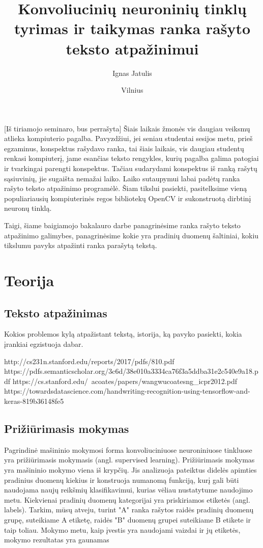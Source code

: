 \documentclass{VUMIFInfBakalaurinis}
\title{Konvoliucinių neuroninių tinklų tyrimas ir taikymas ranka rašyto teksto atpažinimui}
\author{Ignas Jatulis}
\date{Vilnius \\ \the\year}
\begin{document}
\maketitle

\tableofcontents


[Iš tiriamojo seminaro, bus perrašyta]
Šiais laikais žmonės vis daugiau veiksmų atlieka kompiuterio pagalba. Pavyzdžiui, jei seniau studentai sesijos metu, prieš egzaminus, konspektus rašydavo ranka, tai šiais laikais, vis daugiau studentų renkasi kompiuterį, jame esančias teksto rengykles, kurių pagalba galima patogiai ir tvarkingai parengti konspektus. Tačiau sudarydami konspektus iš ranką rašytų sąsiuvinių, jie sugaišta nemažai laiko.  Laiko sutaupymui labai padėtų ranka rašyto teksto atpažinimo programėlė. Šiam tikslui pasiekti, pasitelksime vieną populiariausių kompiuterinės regos bibliotekų OpenCV ir sukonstruotą dirbtinį neuronų tinklą.

Taigi, šiame baigiamojo bakalauro darbe panagrinėsime ranka rašyto teksto atpažinimo galimybes, panagrinėsime kokie yra pradinių duomenų šaltiniai, kokiu tikslumu pavyks atpažinti ranka parašytą tekstą.

\section{Teorija}

\subsection{Teksto atpažinimas}
Kokios problemos kylą atpažistant tekstą, istorija, ką pavyko pasiekti, kokia įrankiai egzistuoja dabar.

http://cs231n.stanford.edu/reports/2017/pdfs/810.pdf
https://pdfs.semanticscholar.org/3c6d/38e010a3334ca76f3a5ddba31e2c540e9a18.pdf
https://cs.stanford.edu/~acoates/papers/wangwucoatesng_icpr2012.pdf
https://towardsdatascience.com/handwriting-recognition-using-tensorflow-and-keras-819b36148fe5


\subsection{Prižiūrimasis mokymas}

Pagrindinė mašininio mokymosi forma konvoliuciniuose neuroniniuose tinkluose yra prižiūrimasis mokymasis (angl. supervised learning). Prižiūrimasis mokymas yra mašininio mokymo viena iš krypčių. Jis analizuoja pateiktus didelės apimties pradinius duomenų kiekius ir konstruoja numanomą funkciją, kurį gali būti naudojama naujų reikšmių klasifikavimui, kurias vėliau nustatytume naudojimo metu. Kiekvienai pradinių duomenų kategorijai yra priskiriamos etiketės (angl. labels). Tarkim, mūsų atveju, turint "A" ranka rašytos raidės pradinių duomenų grupę, suteikiame A etiketę, raidės "B" duomenų grupei suteikiame B etikete ir taip toliau. Mokymo metu, kaip įvestis yra naudojami vaizdai ir jų etiketės, mokymo rezultatas yra gaunamas 
\end{document}
